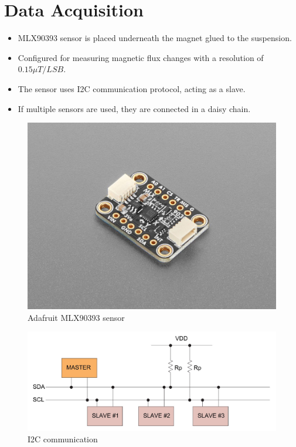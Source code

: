 \section{Data Acquisition}

\begin{itemize}
    \item MLX90393 sensor is placed underneath the magnet glued to the suspension.
    \item Configured for measuring magnetic flux changes with a resolution of \(0.15 \mu T/LSB\).
    \item The sensor uses I2C communication protocol, acting as a slave.
    \item If multiple sensors are used, they are connected in a daisy chain.
\end{itemize}

\begin{figure}[htb]
    \centering
    \includegraphics[height=0.3\textheight]{figures/mlx90393}
    \caption{Adafruit MLX90393 sensor}
\end{figure}
\vskip-0.5cm
\begin{figure}[htb]
    \centering
    \includegraphics[height=0.3\textheight]{figures/i2c}
    \caption{I2C communication}
\end{figure}


